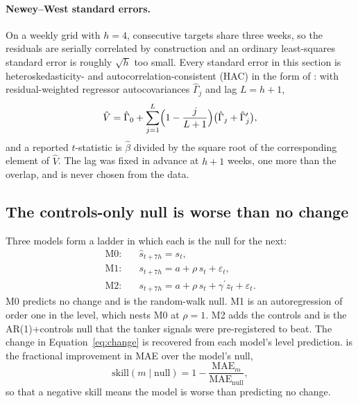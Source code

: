 \paragraph{Newey--West standard errors.} On a weekly grid with $h=4$, consecutive
targets share three weeks, so the residuals are serially correlated by construction
and an ordinary least-squares standard error is roughly $\sqrt{h}$ too small. Every
standard error in this section is heteroskedasticity- and autocorrelation-consistent
(HAC) in the form of \citet{neweywest1987}: with residual-weighted regressor
autocovariances $\hat{\Gamma}_j$ and lag $L = h+1$,
\begin{equation}
  \hat{V} = \hat{\Gamma}_0 + \sum_{j=1}^{L}\Bigl(1 - \frac{j}{L+1}\Bigr)\bigl(\hat{\Gamma}_j + \hat{\Gamma}_j^{\prime}\bigr),
  \label{eq:nw}
\end{equation}
and a reported $t$-statistic is $\hat{\beta}$ divided by the square root of the
corresponding element of $\hat{V}$. The lag was fixed in advance at $h+1$ weeks,
one more than the overlap, and is never chosen from the data.

\subsection{The controls-only null is worse than no change}

Three models form a ladder in which each is the null for the next:
\begin{align}
  \text{M0:}\quad & \hat{s}_{t+7h} = s_t, \label{eq:m0}\\
  \text{M1:}\quad & s_{t+7h} = a + \rho\, s_t + \varepsilon_t, \label{eq:m1}\\
  \text{M2:}\quad & s_{t+7h} = a + \rho\, s_t + \gamma^{\prime} z_t + \varepsilon_t. \label{eq:m2}
\end{align}
M0 predicts no change and is the random-walk null. M1 is an autoregression of
order one in the level, which nests M0 at $\rho=1$. M2 adds the controls and is the
AR(1)+controls null that the tanker signals were pre-registered to beat. The change
in Equation~\eqref{eq:change} is recovered from each model's level prediction.
 is the fractional improvement in MAE over the model's null,
\begin{equation}
  \text{skill}(m \mid \text{null}) = 1 - \frac{\mathrm{MAE}_m}{\mathrm{MAE}_{\text{null}}},
  \label{eq:skill}
\end{equation}
so that a negative skill means the model is worse than predicting no change.

